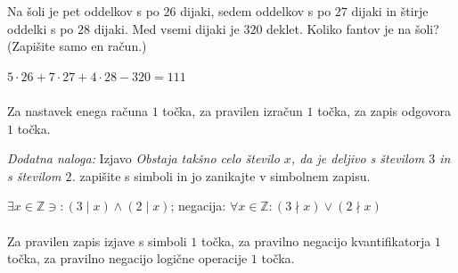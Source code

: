 \documentclass[addpoints]{exam}
\begin{document}
\begin{questions}
        

    \question[3]
    Na šoli je pet oddelkov s po $26$ dijaki, sedem oddelkov s po $27$ dijaki in štirje oddelki s po $28$ dijaki. 
    Med vsemi dijaki je $320$ deklet. Koliko fantov je na šoli? (Zapišite samo en račun.)

    \begin{solution}[7cm]
        $5\cdot 26+7\cdot 27+4\cdot 28-320=111$ \\ \\
        Za nastavek enega računa $1$ točka, za pravilen izračun $1$ točka, za zapis odgovora $1$ točka.
    \end{solution}



    
    \bonusquestion[3]
    \textit{Dodatna naloga:} Izjavo \textit{Obstaja takšno celo število $x$, da je deljivo s številom $3$ in s številom $2$.} zapišite s simboli in jo zanikajte v simbolnem zapisu.
    \begin{solution}
        $\exists x\in\mathbb{Z}\ni:(3\mid x)\land(2\mid x)$; negacija: $\forall x\in\mathbb{Z}: (3\nmid x)\lor(2\nmid x)$ \\ \\
        Za pravilen zapis izjave s simboli $1$ točka, za pravilno negacijo kvantifikatorja $1$ točka, za pravilno negacijo logične operacije $1$ točka.
    \end{solution}

\end{questions}
\end{document}
